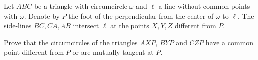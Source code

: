 Let 
$ABC$
 be a triangle with circumcircle 
$\omega$
 and 
$\ell$
 a line without common points with 
$\omega$.
 Denote by 
$P$
 the foot of the perpendicular from the center of 
$\omega$
 to 
$\ell$.
 The side-lines 
$BC,CA,AB$
 intersect 
$\ell$
 at the points 
$X,Y,Z$
 different from 
$P$.

Prove that the circumcircles of the triangles 
$AXP$, 
$BYP$
 and 
$CZP$
 have a common point different from 
$P$
 or are mutually tangent at 
$P$.
